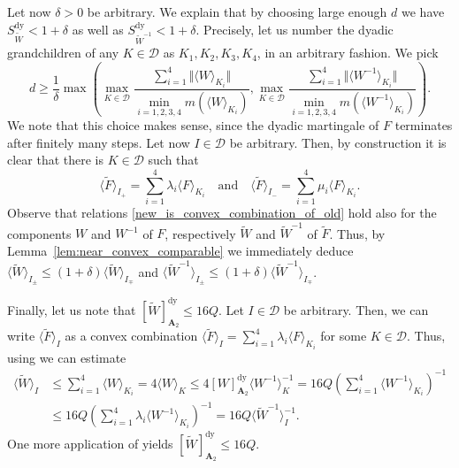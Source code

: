 \documentclass{amsart}
\newcommand{\cD}{\mathcal{D}}
\newcommand{\wt}{\widetilde}
\theoremstyle{definition}
\theoremstyle{remark}
\begin{document}
Let now $\delta>0$ be arbitrary. We explain that by choosing large enough $d$ we have $S^{\text{dy}}_{\wt{W}}<1+\delta$ as well as $S^{\text{dy}}_{\wt{W}^{-1}}<1+\delta$. Precisely, let us number the dyadic grandchildren of any $K\in\cD$ as $K_1,K_2,K_3,K_4$, in an arbitrary fashion. We pick
\begin{equation*}
    d\geq\frac{1}{\delta}\max\left(\max_{K\in\cD}\frac{\sum_{i=1}^{4}\Vert\langle W\rangle_{K_i}\Vert}{\min_{i=1,2,3,4}m(\langle W\rangle_{K_i})},\max_{K\in\cD}\frac{\sum_{i=1}^{4}\Vert\langle W^{-1}\rangle_{K_i}\Vert}{\min_{i=1,2,3,4}m(\langle W^{-1}\rangle_{K_i})}\right).
\end{equation*}
We note that this choice makes sense, since the dyadic martingale of $F$ terminates after finitely many steps. Let now $I\in\cD$ be arbitrary. Then, by construction it is clear that there is $K\in\cD$ such that
\begin{equation}
    \label{new_is_convex_combination_of_old}
    \langle\wt{F}\rangle_{I_{+}}=\sum_{i=1}^{4}\lambda_i\langle F\rangle_{K_{i}}\quad\text{and}\quad\langle\wt{F}\rangle_{I_{-}}=\sum_{i=1}^{4}\mu_i\langle F\rangle_{K_{i}}.
\end{equation}
Observe that relations \eqref{new_is_convex_combination_of_old} hold also for the components $W$ and $W^{-1}$ of $F$, respectively $\wt{W}$ and $\wt{W}^{-1}$ of $\wt{F}$. Thus, by Lemma~\ref{lem:near_convex_comparable} we immediately deduce $\langle \wt{W}\rangle_{I_{\pm}}\leq(1+\delta)\langle \wt{W}\rangle_{I_{\mp}}$ and $\langle \wt{W}^{-1}\rangle_{I_{\pm}}\leq(1+\delta)\langle \wt{W}^{-1}\rangle_{I_{\mp}}$.

Finally, let us note that $[\wt{W}]_{\mathbf{A}_2}^{\text{dy}}\leq 16Q$. Let $I\in\cD$ be arbitrary. Then, we can write $\langle \wt{F}\rangle_{I}$ as a convex combination $\langle \wt{F}\rangle_{I}=\sum_{i=1}^{4}\lambda_i\langle F\rangle_{K_i}$ for some $K\in\cD$. Thus, using \cite[Lemma 3.1]{DoPeTrVo} we can estimate
\begin{align*}
    \langle\wt{W}\rangle_{I}&\leq\sum_{i=1}^{4}\langle W\rangle_{K_i}=4\langle W\rangle_{K}\leq 4[W]_{\mathbf{A}_2}^{\text{dy}}\langle W^{-1}\rangle_{K}^{-1}=16Q\left(\sum_{i=1}^{4}\langle W^{-1}\rangle_{K_i}\right)^{-1}\\
    &\leq 16Q\left(\sum_{i=1}^{4}\lambda_i\langle W^{-1}\rangle_{K_i}\right)^{-1}=16Q\langle\wt{W}^{-1}\rangle_{I}^{-1}.
\end{align*}
One more application of \cite[Lemma 3.1]{DoPeTrVo} yields $[\wt{W}]_{\mathbf{A}_2}^{\text{dy}}\leq 16Q$.
\end{document}
